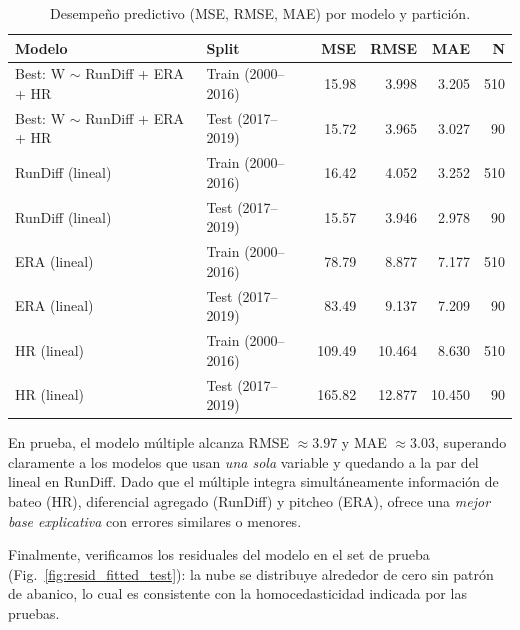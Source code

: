 \documentclass[man,floatsintext]{apa7}
\begin{document}
\begin{table}[H]
    \centering
    \caption{Desempeño predictivo (MSE, RMSE, MAE) por modelo y partición.}
    \label{tab:forecast_metrics}
    \begin{tabular}{l l r r r r}
        \toprule
        Modelo & Split & MSE & RMSE & MAE & N \\
        \midrule
        Best: W $\sim$ RunDiff + ERA + HR & Train (2000--2016) & 15.98 & 3.998 & 3.205 & 510 \\
        Best: W $\sim$ RunDiff + ERA + HR & Test (2017--2019)  & 15.72 & 3.965 & 3.027 &  90 \\
        RunDiff (lineal)                   & Train (2000--2016) & 16.42 & 4.052 & 3.252 & 510 \\
        RunDiff (lineal)                   & Test (2017--2019)  & 15.57 & 3.946 & 2.978 &  90 \\
        ERA (lineal)                       & Train (2000--2016) & 78.79 & 8.877 & 7.177 & 510 \\
        ERA (lineal)                       & Test (2017--2019)  & 83.49 & 9.137 & 7.209 &  90 \\
        HR (lineal)                        & Train (2000--2016) &109.49 &10.464 & 8.630 & 510 \\
        HR (lineal)                        & Test (2017--2019)  &165.82 &12.877 &10.450 &  90 \\
        \bottomrule
    \end{tabular}
\end{table}

En prueba, el modelo múltiple alcanza RMSE $\approx 3.97$ y MAE $\approx 3.03$, superando claramente a los modelos que usan \emph{una sola} variable y quedando a la par del lineal en RunDiff. Dado que el múltiple integra simultáneamente información de bateo (HR), diferencial agregado (RunDiff) y pitcheo (ERA), ofrece una \emph{mejor base explicativa} con errores similares o menores.

Finalmente, verificamos los residuales del modelo en el set de prueba (Fig.~\ref{fig:resid_fitted_test}): la nube se distribuye alrededor de cero sin patrón de abanico, lo cual es consistente con la homocedasticidad indicada por las pruebas.
\end{document}
